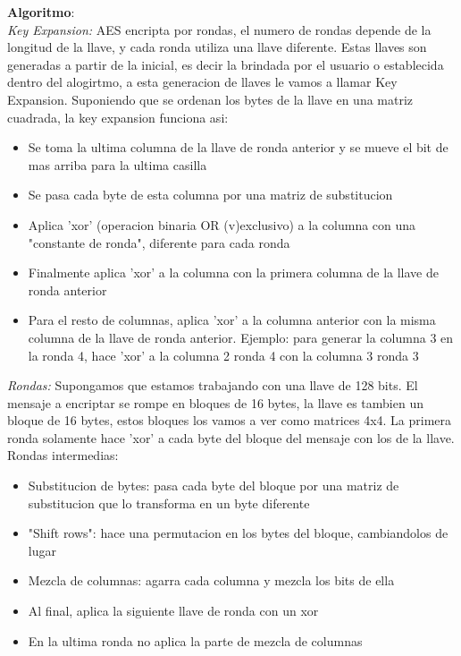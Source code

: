 \documentclass[spanish]{article}
\begin{document}
\textbf{Algoritmo}:\\

\emph{Key Expansion:}
AES encripta por rondas, el numero de rondas depende de la longitud de la llave, y cada ronda utiliza una llave diferente. Estas llaves son generadas a partir de la inicial, es decir la brindada por el usuario o establecida dentro del alogirtmo, a esta generacion de llaves le vamos a llamar Key Expansion.
Suponiendo que se ordenan los bytes de la llave en una matriz cuadrada, la key expansion funciona asi:
\begin{itemize}
\item Se toma la ultima columna de la llave de ronda anterior y se mueve el bit de mas arriba para la ultima casilla
\item Se pasa cada byte de esta columna por una matriz de substitucion
\item Aplica 'xor' (operacion binaria OR (v)exclusivo) a la columna con una "constante de ronda", diferente para cada ronda
\item Finalmente aplica 'xor' a la columna con la primera columna de la llave de ronda anterior
\item Para el resto de columnas, aplica 'xor' a la columna anterior con la misma columna de la llave de ronda anterior. Ejemplo: para generar la columna 3 en la ronda 4, hace 'xor' a la columna 2 ronda 4 con la columna 3 ronda 3
\end{itemize}

\emph{Rondas:}
Supongamos que estamos trabajando con una llave de 128 bits. El mensaje a encriptar se rompe en bloques de 16 bytes, la llave es tambien un bloque de 16 bytes, estos bloques los vamos a ver como matrices 4x4.
La primera ronda solamente hace 'xor' a cada byte del bloque del mensaje con los de la llave.
Rondas intermedias:
\begin{itemize}
\item Substitucion de bytes: pasa cada byte del bloque por una matriz de substitucion que lo transforma en un byte diferente
\item "Shift rows": hace una permutacion en los bytes del bloque, cambiandolos de lugar
\item Mezcla de columnas: agarra cada columna y mezcla los bits de ella
\item Al final, aplica la siguiente llave de ronda con un xor
\item En la ultima ronda no aplica la parte de mezcla de columnas
\end{itemize}
\end{document}
